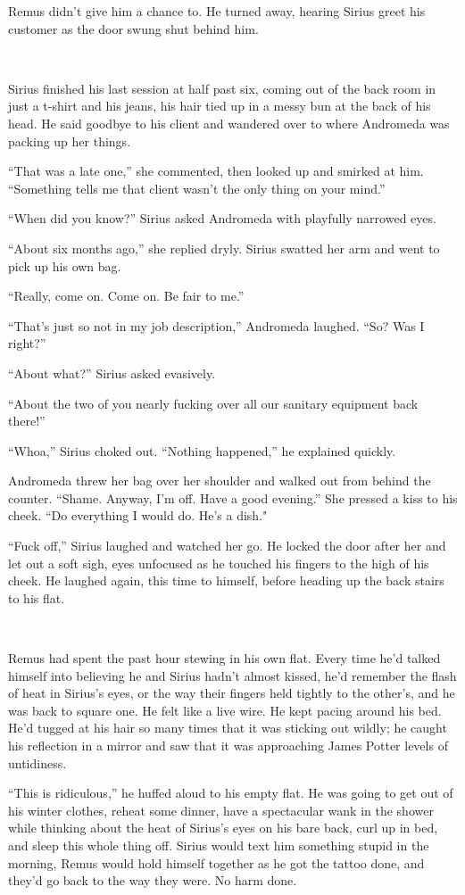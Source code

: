 Remus didn’t give him a chance to. He turned away, hearing Sirius greet his customer as the door swung shut behind him.

~

Sirius finished his last session at half past six, coming out of the back room in just a t-shirt and his jeans, his hair tied up in a messy bun at the back of his head. He said goodbye to his client and wandered over to where Andromeda was packing up her things.

“That was a late one,” she commented, then looked up and smirked at him. “Something tells me that client wasn’t the only thing on your mind.”

“When did you know?” Sirius asked Andromeda with playfully narrowed eyes.

“About six months ago,” she replied dryly. Sirius swatted her arm and went to pick up his own bag.

“Really, come on. Come on. Be fair to me.”

“That’s just so not in my job description,” Andromeda laughed. “So? Was I right?”

“About what?” Sirius asked evasively.

“About the two of you nearly fucking over all our sanitary equipment back there!”

“Whoa,” Sirius choked out. “Nothing happened,” he explained quickly.

Andromeda threw her bag over her shoulder and walked out from behind the counter. “Shame. Anyway, I’m off. Have a good evening.” She pressed a kiss to his cheek. “Do everything I would do. He’s a dish."

“Fuck off,” Sirius laughed and watched her go. He locked the door after her and let out a soft sigh, eyes unfocused as he touched his fingers to the high of his cheek. He laughed again, this time to himself, before heading up the back stairs to his flat.

~

Remus had spent the past hour stewing in his own flat. Every time he’d talked himself into believing he and Sirius hadn’t almost kissed, he’d remember the flash of heat in Sirius’s eyes, or the way their fingers held tightly to the other’s, and he was back to square one. He felt like a live wire. He kept pacing around his bed. He’d tugged at his hair so many times that it was sticking out wildly; he caught his reflection in a mirror and saw that it was approaching James Potter levels of untidiness.

“This is ridiculous,” he huffed aloud to his empty flat. He was going to get out of his winter clothes, reheat some dinner, have a spectacular wank in the shower while thinking about the heat of Sirius’s eyes on his bare back, curl up in bed, and sleep this whole thing off. Sirius would text him something stupid in the morning, Remus would hold himself together as he got the tattoo done, and they’d go back to the way they were. No harm done.

